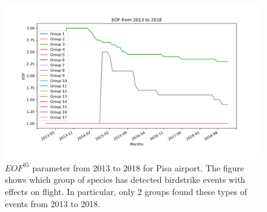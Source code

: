 \begin{figure}
	\centering
	\includegraphics[width=13cm]{img/EOF.png}
	\caption{$EOF^{95}$ parameter from 2013 to 2018 for Pisa airport. The figure shows which group of species has detected birdstrike events with effects on flight. In particular, only 2 groups found these types of events from 2013 to 2018.}
	\label{EOF_fig}
\end{figure}

